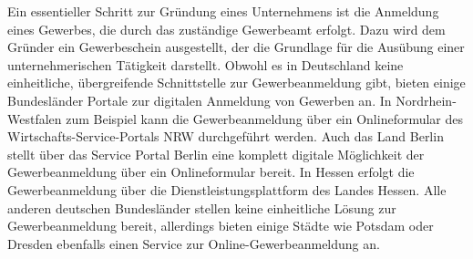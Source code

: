 Ein essentieller Schritt zur Gründung eines Unternehmens ist die Anmeldung eines Gewerbes, die durch das zuständige Gewerbeamt erfolgt. 
 Dazu wird dem Gründer ein Gewerbeschein ausgestellt, der die Grundlage für die Ausübung einer unternehmerischen Tätigkeit darstellt. 
 Obwohl es in Deutschland keine einheitliche, übergreifende Schnittstelle zur Gewerbeanmeldung gibt, bieten einige Bundesländer Portale zur digitalen Anmeldung von Gewerben an. 
 In Nordrhein-Westfalen zum Beispiel kann die Gewerbeanmeldung über ein Onlineformular des Wirtschafts-Service-Portals NRW durchgeführt werden. 
 Auch das Land Berlin stellt über das Service Portal Berlin eine komplett digitale Möglichkeit der Gewerbeanmeldung über ein Onlineformular bereit. 
 In Hessen erfolgt die Gewerbeanmeldung über die Dienstleistungsplattform des Landes Hessen. 
 Alle anderen deutschen Bundesländer stellen keine einheitliche Lösung zur Gewerbeanmeldung bereit, allerdings bieten einige Städte wie Potsdam oder Dresden ebenfalls einen Service zur Online-Gewerbeanmeldung an.

